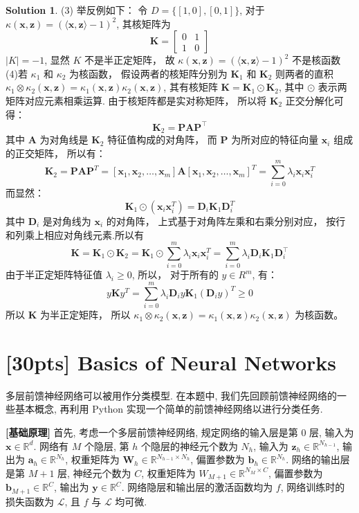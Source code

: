 \documentclass[a4paper,UTF8]{article}
\numberwithin{equation}{section}
\theoremstyle{definition}
\newtheorem*{solution}{Solution}
\def \A {\mathbf{A}}
\def \K {\mathbf{K}}
\def \D {\mathbf{D}}
\def \P {\mathbf{P}}
\def \x {\boldsymbol{x}}
\def \z {\mathbf{z}}
\begin{document}
\begin{solution}
(3) 举反例如下：
令 $D = \{[1, 0], [0, 1]\}$, 对于 $\kappa(\x, \z) = (\langle \x, \z \rangle - 1)^2$, 其核矩阵为
$$\K =
\begin{bmatrix}
0 & 1 \\
1 & 0
\end{bmatrix}
$$
$|K| = -1$, 显然 $K$ 不是半正定矩阵， 故 $\kappa(\x, \z) = (\langle \x, \z \rangle - 1)^2$ 不是核函数\\

(4)若 $\kappa_1$ 和 $\kappa_2$ 为核函数， 假设两者的核矩阵分别为 $\K_1$ 和 $\K_2$ 则两者的直积 $\kappa_1 \otimes \kappa_2(\x, \z) = \kappa_1(\x, \z) \kappa_2(\x, \z)$, 其有核矩阵 $\K = \K_1 \odot \K_2$, 其中 $\odot$ 表示两矩阵对应元素相乘运算. 由于核矩阵都是实对称矩阵， 所以将 $\K_2$ 正交分解化可得：
$$\K_2 = \P \A \P^\top$$
其中 $\A$ 为对角线是 $\K_2$ 特征值构成的对角阵， 而 $\P$ 为所对应的特征向量 $\x_i$ 组成的正交矩阵， 所以有：
$$\K_2 = \P \A \P^T = [\x_1, \x_2, \ldots, \x_m] \A [\x_1, \x_2, \ldots, \x_m]^T = \sum_{i=0}^{m} \lambda_i \x_i \x_i^T$$
而显然：
$$\K_1 \odot (\x_i \x_i^T) = \D_i \K_1 \D_i^T$$
其中 $\D_i$ 是对角线为 $\x_i$ 的对角阵， 上式基于对角阵左乘和右乘分别对应， 按行和列乘上相应对角线元素.所以有
$$\K = \K_1 \odot \K_2 = \K_1 \odot \sum_{i=0}^{m} \lambda_i \x_i \x_i^T = \sum_{i=0}^{m} \lambda_i \D_i \K_1 \D_i^\top$$
由于半正定矩阵特征值 $\lambda_i \geq 0$, 所以， 对于所有的 $y \in R^m$, 有：
$$y \K y^T = \sum_{i=0}^{m} \lambda_i \D_i y \K_1 (\D_i y)^T \geq 0$$
所以 $\K$ 为半正定矩阵， 所以 $\kappa_1 \otimes \kappa_2(\x, \z) = \kappa_1(\x, \z) \kappa_2(\x, \z)$ 为核函数。
\end{solution}

\newpage

\section{[30pts] Basics of Neural Networks}

多层前馈神经网络可以被用作分类模型. 在本题中, 我们先回顾前馈神经网络的一些基本概念, 再利用 Python 实现一个简单的前馈神经网络以进行分类任务.

\textbf{[基础原理]} 首先, 考虑一个多层前馈神经网络, 规定网络的输入层是第 $0$ 层, 输入为 $\mathbf{x} \in \mathbb{R}^d$. 网络有 $M$ 个隐层, 第 $h$ 个隐层的神经元个数为 $N_h$, 输入为 $\mathbf{z}_h\in \mathbb{R}^{N_{h-1}}$, 输出为 $\mathbf{a}_h \in \mathbb{R}^{N_h}$, 权重矩阵为 $\mathbf{W}_h \in \mathbb{R}^{N_{h-1} \times N_{h}}$, 偏置参数为 $\mathbf{b}_h \in \mathbb{R}^{N_h}$. 网络的输出层是第 $M+1$ 层, 神经元个数为 $C$, 权重矩阵为 $W_{M+1} \in \mathbb{R}^{N_M \times C}$, 偏置参数为 $\mathbf{b}_{M+1} \in \mathbb{R}^C$, 输出为 $\mathbf{y} \in \mathbb{R}^C$. 网络隐层和输出层的激活函数均为 $f$, 网络训练时的损失函数为 $\mathcal{L}$, 且 $f$ 与 $\mathcal{L}$ 均可微.
\end{document}
